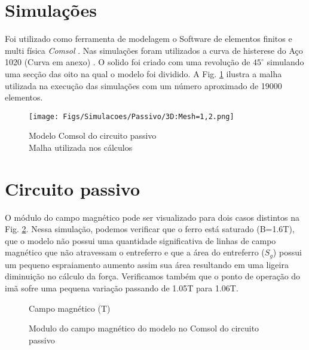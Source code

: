 \newpage
\section{Simulações}

 Foi utilizado como ferramenta de modelagem o Software de elementos finitos e multi física \textit{Comsol} . Nas simulações foram utilizados a curva de histerese do Aço 1020 (Curva em anexo) . O solido foi criado com uma revolução de $45^\circ$ simulando uma secção das oito na qual o modelo foi dividido.  A Fig. \ref{Fig:Simulacao:Passivo:Mesh} ilustra a malha utilizada na execução das simulações com um número aproximado de 19000 elementos.
 
  
 	\begin{figure}[!ht]
 		\centering
 		\texttt{[image: Figs/Simulacoes/Passivo/3D:Mesh=1,2.png]}
 			\caption{Modelo Comsol do circuito passivo \\ Malha utilizada nos cálculos}
 			\label{Fig:Simulacao:Passivo:Mesh}
 	\end{figure}
 

\section{Circuito passivo}

 O módulo do campo magnético pode ser visualizado para dois casos distintos na Fig. \ref{Fig:Simulacao:Passivo:2D:B}. Nessa simulação, podemos verificar que o ferro está saturado (B=1.6T), que o modelo não possui uma quantidade significativa de linhas de campo magnético que não atravessam o entreferro e que a área do entreferro ($S_g$) possui um pequeno espraiamento aumento assim sua área resultando em uma ligeira diminuição no cálculo da força. Verificamos também que o ponto de operação do imã sofre uma pequena variação passando de 1.05T para 1.06T.

	\begin{figure}[!ht]
		\centering
		\caption*{Campo magnético (T)}
		\subfloat[t][$\Delta_x = 0.6mm$ e $\Delta_z = 0$]
		{
			\texttt{[image: Figs/Simulacoes/Passivo/2D:B:dx=0,6.png]}
		} \label{Fig:Simulacao:Passivo:2D:B:dx=0.6}
		\subfloat[b][$\Delta_x = 1.2mm$ e $\Delta_z = 0$]
		{
			\texttt{[image: Figs/Simulacoes/Passivo/2D:B:dx=1,2.png]}
		}	
		\caption{Modulo do campo magnético do modelo no Comsol do circuito passivo}\label{Fig:Simulacao:Passivo:2D:B:dx=1.2}
		\label{Fig:Simulacao:Passivo:2D:B}
	\end{figure}

